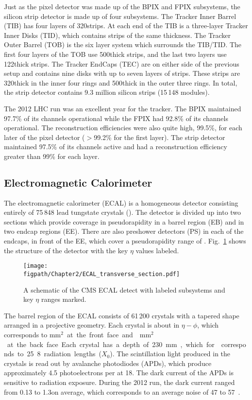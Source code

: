 Just as the pixel detector was made up of the BPIX and FPIX subsystems, the silicon strip detector is made up of four subsystems.
The Tracker Inner Barrel
(TIB) has four layers of 320\mum strips.
At each end of the TIB is a three-layer Tracker Inner Disks (TID), which contains strips of the same thickness.
The Tracker Outer Barrel (TOB) is the six layer system which surrounds the TIB/TID.
The first four layers of the TOB use 500\mum thick strips, and the last two layers use 122\mum thick strips.
The Tracker EndCaps (TEC) are on either side of the previous setup and contains nine disks with up to seven layers of strips.
These strips are 320\mum thick in the inner four rings and 500\mum thick in the outer three rings.
In total, the strip detector contains 9.3 million silicon strips (15\,148 modules).

The 2012 LHC run was an excellent year for the tracker.
The BPIX maintained 97.7\% of its channels operational while the FPIX had 92.8\% of its channels operational.
The reconstruction efficiencies were also quite high, 99.5\%, for each later of the pixel detector ($>$99.2\% for the first layer).
The strip detector maintained 97.5\% of its channels active and had a reconstruction efficiency greater than 99\% for each layer\cite{Veszpremi:2014hpa}. 

\subsection{Electromagnetic Calorimeter}

The electromagnetic calorimeter (ECAL) is a homogeneous detector consisting entirely of 75\,848 lead tungstate crystals (\PbWO).
The detector is divided up into two sections which provide coverage in pseudorapidity  in a barrel region (EB) and  in two endcap regions (EE).
There are also preshower detectors (PS) in each of the endcaps, in front of the EE, which cover a pseudorapidity range of .
Fig.~\ref{fig:CMS_ECAL} shows the structure of the detector with the key $\eta$ values labeled.

\begin{figure}[!hbt]
	\centering
	\texttt{[image: \\figpath/Chapter2/ECAL\_transverse\_section.pdf]}
	\caption{A schematic of the CMS ECAL detect with labeled subsystems and key $\eta$ ranges marked.}
	\label{fig:CMS_ECAL}
\end{figure}

The barrel region of the ECAL consists of 61\,200 crystals with a tapered shape arranged in a projective geometry. Each crystal is about  in $\eta-\phi$, which corresponds to \unit{mm$^{\text{2}}$} at the front face and \unit{mm$^{\text{2}}$} at the back face. Each crystal has a depth of 230\mm, which for \PbWO corresponds to 25.8 radiation lengths ($X_{0}$). The scintillation light produced in the crystals is read out by avalanche photodiodes (APDs), which produce approximately 4.5 photoelectrons per \MeVns at 18\degC. The dark current of the APDs is sensitive to radiation exposure. During the 2012 run, the dark current ranged from 0.13 to 1.3\muA on average, which corresponds to an average noise of 47 to 57\mev~\cite{CMS:2013ecal}.

